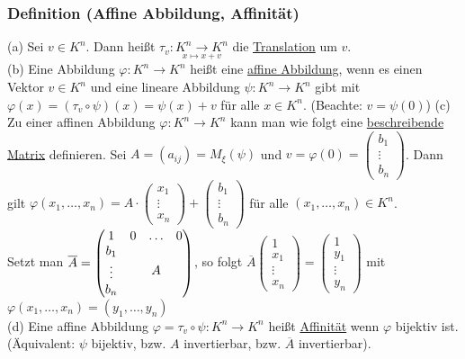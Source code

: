 \documentclass[a4paper]{article}
\newcommand{\ul}{\underline}
\let\phi\varphi
\begin{document}
\subsubsection{Definition (Affine Abbildung, Affinität)}
(a) Sei \(v\in K^n\). Dann heißt \(\tau_v:\underset{x\mapsto x+v}{K^n\rightarrow K^n}\) die \ul{Translation} um \(v\).\\
(b) Eine Abbildung \(\phi:K^n\rightarrow K^n\) heißt eine \ul{affine Abbildung}, wenn es einen Vektor \(v\in K^n\) und eine lineare Abbildung \(\psi:K^n\rightarrow K^n\) gibt mit \(\phi(x)=(\tau_v\circ \psi)(x)=\psi(x)+v\) für alle \(x\in K^n\). (Beachte: \(v=\psi(0)\))
(c) Zu einer affinen Abbildung \(\phi:K^n\rightarrow K^n\) kann man wie folgt eine \ul{beschreibende Matrix} definieren. Sei \(A=(a_{ij})=M_\xi(\psi)\) und \(v=\phi(0)=\begin{pmatrix}
b_1\\
\vdots\\
b_n
\end{pmatrix}\). Dann gilt \(\phi(x_1,\dots,x_n)=A\cdot\begin{pmatrix}
x_1\\
\vdots\\
x_n
\end{pmatrix}+\begin{pmatrix}
b_1\\
\vdots\\
b_n
\end{pmatrix}\) für alle \((x_1,\dots,x_n)\in K^n\).\\
Setzt man \(\overline{A}=\begin{pmatrix}
1 & 0 & \hdots & 0\\
\begin{matrix}
b_1\\
\vdots\\
b_n
\end{matrix} & & \Huge A &
\end{pmatrix}\), so folgt \(\overline{A}\begin{pmatrix}
1\\
x_1\\
\vdots\\
x_n
\end{pmatrix}=\begin{pmatrix}
1\\
y_1\\
\vdots\\
y_n
\end{pmatrix}\) mit \(\phi(x_1,\dots,x_n)=(y_1,\dots,y_n)\)\\
(d) Eine affine Abbildung \(\phi=\tau_v\circ \psi:K^n\rightarrow K^n\) heißt \ul{Affinität} wenn \(\phi\) bijektiv ist. (Äquivalent: \(\psi\) bijektiv, bzw. \(A\) invertierbar, bzw. \(\overline{A}\) invertierbar).
\end{document}
